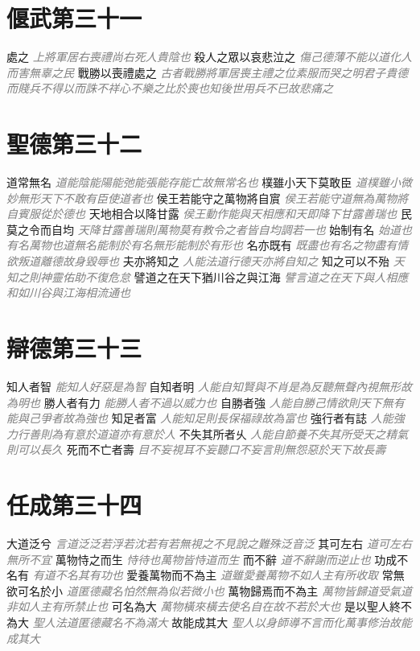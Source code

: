 \documentclass[a4paper,zihao=-4,oneside,landscape,UTF8]{ctexart}
\newcommand{\zhushi}[1]{\scriptsize{\textit{\textcolor{gray}{#1}}}\normalsize}
\begin{document}
\section{偃武第三十一}

處之
\zhushi{上將軍居右喪禮尚右死人貴陰也}
殺人之眾以哀悲泣之
\zhushi{傷己德薄不能以道化人而害無辜之民}
戰勝以喪禮處之
\zhushi{古者戰勝將軍居喪主禮之位素服而哭之明君子貴德而賤兵不得以而誅不祥心不樂之比於喪也知後世用兵不已故悲痛之}


\section{聖德第三十二}

道常無名
\zhushi{道能陰能陽能弛能張能存能亡故無常名也}
樸雖小天下莫敢臣
\zhushi{道樸雖小微妙無形天下不敢有臣使道者也}
侯王若能守之萬物將自賔
\zhushi{侯王若能守道無為萬物將自賓服從於德也}
天地相合以降甘露
\zhushi{侯王動作能與天相應和天即降下甘露善瑞也}
民莫之令而自均
\zhushi{天降甘露善瑞則萬物莫有教令之者皆自均調若一也}
始制有名
\zhushi{始道也有名萬物也道無名能制於有名無形能制於有形也}
名亦既有
\zhushi{既盡也有名之物盡有情欲叛道離德故身毀辱也}
夫亦將知之
\zhushi{人能法道行德天亦將自知之}
知之可以不殆
\zhushi{天知之則神靈佑助不復危怠}
譬道之在天下猶川谷之與江海
\zhushi{譬言道之在天下與人相應和如川谷與江海相流通也}


\section{辯德第三十三}

知人者智
\zhushi{能知人好惡是為智}
自知者明
\zhushi{人能自知賢與不肖是為反聽無聲內視無形故為明也}
勝人者有力
\zhushi{能勝人者不過以威力也}
自勝者強
\zhushi{人能自勝己情欲則天下無有能與己爭者故為強也}
知足者富
\zhushi{人能知足則長保福祿故為富也}
強行者有誌
\zhushi{人能強力行善則為有意於道道亦有意於人}
不失其所者乆
\zhushi{人能自節養不失其所受天之精氣則可以長久}
死而不亡者壽
\zhushi{目不妄視耳不妄聽口不妄言則無怨惡於天下故長壽}


\section{任成第三十四}

大道泛兮
\zhushi{言道泛泛若浮若沈若有若無視之不見說之難殊泛音泛}
其可左右
\zhushi{道可左右無所不宜}
萬物恃之而生
\zhushi{恃待也萬物皆恃道而生}
而不辭
\zhushi{道不辭謝而逆止也}
功成不名有
\zhushi{有道不名其有功也}
愛養萬物而不為主
\zhushi{道雖愛養萬物不如人主有所收取}
常無欲可名於小
\zhushi{道匿德藏名怕然無為似若微小也}
萬物歸焉而不為主
\zhushi{萬物皆歸道受氣道非如人主有所禁止也}
可名為大
\zhushi{萬物橫來橫去使名自在故不若於大也}
是以聖人終不為大
\zhushi{聖人法道匿德藏名不為滿大}
故能成其大
\zhushi{聖人以身師導不言而化萬事修治故能成其大}
\end{document}
